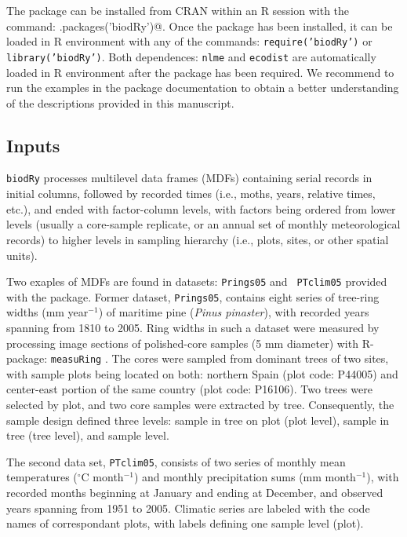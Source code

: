 \documentclass[review,authoryear]{elsarticle}
\begin{document}
The package can be installed from CRAN within an R session with the
command: \verb@install.packages('biodRy')@. Once the package has been
installed, it can be loaded in R environment with any of the commands:
{\tt require('biodRy')} or {\tt library('biodRy')}. Both
dependences: {\tt nlme} and {\tt ecodist} are automatically loaded in R
environment after the package has been required. We recommend to run
the examples in the package documentation to obtain a better
understanding of the descriptions provided in this manuscript.

\subsection{Inputs}\label{sec:inputs}

{\tt biodRy} processes multilevel data frames (MDFs) containing
serial records in initial columns, followed by recorded times (i.e.,
moths, years, relative times, etc.), and ended with factor-column
levels, with factors being ordered from lower levels (usually a
core-sample replicate, or an annual set of monthly meteorological
records) to higher levels in sampling hierarchy (i.e., plots, sites,
or other spatial units).

Two exaples of MDFs are found in datasets: {\tt Prings05} and {\tt
  PTclim05} provided with the package. Former dataset, {\tt Prings05},
contains eight series of tree-ring widths (mm year$^{-1}$) of maritime
pine (\textit{Pinus pinaster}), with recorded years spanning from 1810
to 2005. Ring widths in such a dataset were measured by processing
image sections of polished-core samples (5 mm diameter) with
R-package: {\tt measuRing} \citep{Lara2015}. The cores were sampled
from dominant trees of two sites, with sample plots being located on
both: northern Spain (plot code: P44005) and center-east portion of
the same country (plot code: P16106). Two trees were selected by plot,
and two core samples were extracted by tree. Consequently, the sample
design defined three levels: sample in tree on plot (plot level),
sample in tree (tree level), and sample level. 

The second data set, {\tt PTclim05}, consists of two series of monthly
mean temperatures ($^{\circ}$C month$^{-1}$) and monthly precipitation
sums (mm month$^{-1}$), with recorded months beginning at January and
ending at December, and observed years spanning from 1951 to
2005. Climatic series are labeled with the code names of correspondant
plots, with labels defining one sample level (plot).
\end{document}
